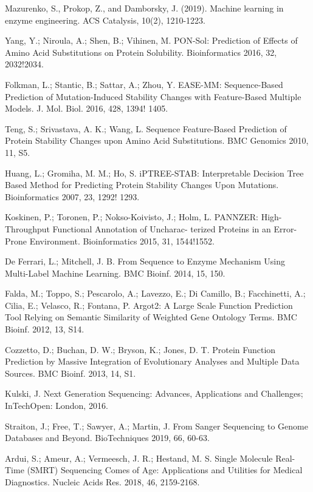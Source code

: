 \documentclass[12pt]{article}
\begin{document}
\begin{thebibliography}{20}
Mazurenko, S., Prokop, Z., and Damborsky, J. (2019). Machine learning in enzyme engineering. ACS Catalysis, 10(2), 1210-1223. 

 Yang, Y.; Niroula, A.; Shen, B.; Vihinen, M. PON-Sol: Prediction of Effects of Amino Acid Substitutions on Protein Solubility. Bioinformatics 2016, 32, 2032!2034.

 Folkman, L.; Stantic, B.; Sattar, A.; Zhou, Y. EASE-MM: Sequence-Based Prediction of Mutation-Induced Stability Changes with Feature-Based Multiple Models. J. Mol. Biol. 2016, 428, 1394! 1405.

 Teng, S.; Srivastava, A. K.; Wang, L. Sequence Feature-Based Prediction of Protein Stability Changes upon Amino Acid Substitutions. BMC Genomics 2010, 11, S5.

 Huang, L.; Gromiha, M. M.; Ho, S. iPTREE-STAB: Interpretable Decision Tree Based Method for Predicting Protein Stability Changes Upon Mutations. Bioinformatics 2007, 23, 1292! 1293.


 Koskinen, P.; Toronen, P.; Nokso-Koivisto, J.; Holm, L. PANNZER: High-Throughput Functional Annotation of Uncharac- terized Proteins in an Error-Prone Environment. Bioinformatics 2015, 31, 1544!1552.

 De Ferrari, L.; Mitchell, J. B. From Sequence to Enzyme Mechanism Using Multi-Label Machine Learning. BMC Bioinf. 2014, 15, 150.

 Falda, M.; Toppo, S.; Pescarolo, A.; Lavezzo, E.; Di Camillo, B.; Facchinetti, A.; Cilia, E.; Velasco, R.; Fontana, P. Argot2: A Large Scale Function Prediction Tool Relying on Semantic Similarity of Weighted Gene Ontology Terms. BMC Bioinf. 2012, 13, S14.

 Cozzetto, D.; Buchan, D. W.; Bryson, K.; Jones, D. T. Protein Function Prediction by Massive Integration of Evolutionary Analyses and Multiple Data Sources. BMC Bioinf. 2013, 14, S1.

 Kulski, J. Next Generation Sequencing: Advances, Applications and Challenges; InTechOpen: London, 2016.

 Straiton, J.; Free, T.; Sawyer, A.; Martin, J. From Sanger Sequencing to Genome Databases and Beyond. BioTechniques 2019, 66, 60-63.

 Ardui, S.; Ameur, A.; Vermeesch, J. R.; Hestand, M. S. Single Molecule Real-Time (SMRT) Sequencing Comes of Age: Applications and Utilities for Medical Diagnostics. Nucleic Acids Res. 2018, 46, 2159-2168.


\end{thebibliography}
\end{document}
